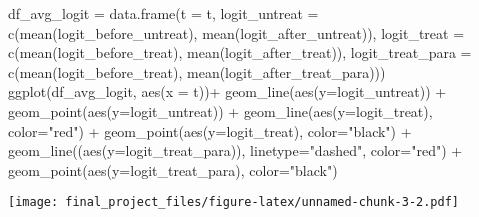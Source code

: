 \documentclass[
]{article}
\newenvironment{Shaded}{\begin{snugshade}}{\end{snugshade}}
\newcommand{\AttributeTok}[1]{\textcolor[rgb]{0.77,0.63,0.00}{#1}}
\newcommand{\FunctionTok}[1]{\textcolor[rgb]{0.00,0.00,0.00}{#1}}
\newcommand{\NormalTok}[1]{#1}
\newcommand{\OtherTok}[1]{\textcolor[rgb]{0.56,0.35,0.01}{#1}}
\newcommand{\SpecialCharTok}[1]{\textcolor[rgb]{0.00,0.00,0.00}{#1}}
\newcommand{\StringTok}[1]{\textcolor[rgb]{0.31,0.60,0.02}{#1}}
\begin{document}
\begin{Shaded}
\begin{Highlighting}[]
\NormalTok{df\_avg\_logit }\OtherTok{=} \FunctionTok{data.frame}\NormalTok{(}\AttributeTok{t =}\NormalTok{ t,}
                          \AttributeTok{logit\_untreat =} \FunctionTok{c}\NormalTok{(}\FunctionTok{mean}\NormalTok{(logit\_before\_untreat), }\FunctionTok{mean}\NormalTok{(logit\_after\_untreat)), }
                          \AttributeTok{logit\_treat =} \FunctionTok{c}\NormalTok{(}\FunctionTok{mean}\NormalTok{(logit\_before\_treat), }\FunctionTok{mean}\NormalTok{(logit\_after\_treat)),}
                          \AttributeTok{logit\_treat\_para =} \FunctionTok{c}\NormalTok{(}\FunctionTok{mean}\NormalTok{(logit\_before\_treat), }\FunctionTok{mean}\NormalTok{(logit\_after\_treat\_para)))}
\FunctionTok{ggplot}\NormalTok{(df\_avg\_logit, }\FunctionTok{aes}\NormalTok{(}\AttributeTok{x =}\NormalTok{ t))}\SpecialCharTok{+}
  \FunctionTok{geom\_line}\NormalTok{(}\FunctionTok{aes}\NormalTok{(}\AttributeTok{y=}\NormalTok{logit\_untreat)) }\SpecialCharTok{+} 
  \FunctionTok{geom\_point}\NormalTok{(}\FunctionTok{aes}\NormalTok{(}\AttributeTok{y=}\NormalTok{logit\_untreat)) }\SpecialCharTok{+}
  \FunctionTok{geom\_line}\NormalTok{(}\FunctionTok{aes}\NormalTok{(}\AttributeTok{y=}\NormalTok{logit\_treat), }\AttributeTok{color=}\StringTok{"red"}\NormalTok{) }\SpecialCharTok{+} 
  \FunctionTok{geom\_point}\NormalTok{(}\FunctionTok{aes}\NormalTok{(}\AttributeTok{y=}\NormalTok{logit\_treat), }\AttributeTok{color=}\StringTok{"black"}\NormalTok{) }\SpecialCharTok{+} 
  \FunctionTok{geom\_line}\NormalTok{((}\FunctionTok{aes}\NormalTok{(}\AttributeTok{y=}\NormalTok{logit\_treat\_para)), }\AttributeTok{linetype=}\StringTok{"dashed"}\NormalTok{, }\AttributeTok{color=}\StringTok{"red"}\NormalTok{) }\SpecialCharTok{+}
  \FunctionTok{geom\_point}\NormalTok{(}\FunctionTok{aes}\NormalTok{(}\AttributeTok{y=}\NormalTok{logit\_treat\_para), }\AttributeTok{color=}\StringTok{"black"}\NormalTok{)}
\end{Highlighting}
\end{Shaded}

\texttt{[image: final\_project\_files/figure-latex/unnamed-chunk-3-2.pdf]}
\end{document}

